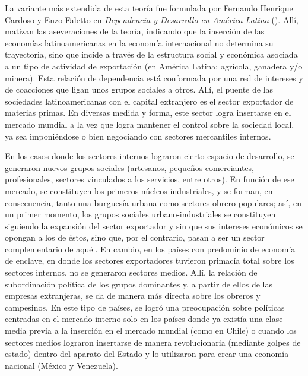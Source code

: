 \documentclass{article}
\begin{document}
La variante más extendida de esta teoría fue formulada por Fernando Henrique Cardoso
y Enzo Faletto en \textit{Dependencia y Desarrollo en América Latina} 
(\citeyear{cardoso1979dependencia}). Allí, matizan las aseveraciones de la teoría, 
indicando que la inserción de las economías latinoamericanas en la economía internacional
no determina su trayectoria, sino que incide a través de la estructura social y económica
asociada a un tipo de actividad de exportación (en América Latina: agrícola, ganadera y/o
minera). Esta relación de dependencia está conformada por una red de intereses y de 
coacciones que ligan unos grupos sociales a otros. Allí, el puente de las sociedades 
latinoamericanas con el capital extranjero es el sector exportador de materias primas. 
En diversas medida y forma, este sector logra insertarse en el mercado mundial a la vez 
que logra mantener el control sobre la sociedad local, ya sea imponiéndose o bien 
negociando con sectores mercantiles internos.

En los casos donde los sectores internos lograron cierto espacio de desarrollo, se generaron
nuevos grupos sociales (artesanos, pequeños comerciantes, profesionales, sectores vinculados
a los servicios, entre otros). En función de ese mercado, se constituyen los primeros 
núcleos industriales, y se forman, en consecuencia, tanto una burguesía urbana como sectores 
obrero-populares; así, en un primer momento, los grupos sociales urbano-industriales se 
constituyen siguiendo la expansión del sector exportador y sin que sus intereses económicos 
se opongan a los de éstos, sino que, por el contrario, pasan a ser un sector complementario 
de aquél. En cambio, en los países con predominio de economía de enclave, en donde los 
sectores exportadores tuvieron primacía total sobre los sectores internos, no se generaron 
sectores medios. Allí, la relación de subordinación política de los grupos dominantes y, a 
partir de ellos de las empresas extranjeras, se da de manera más directa sobre los obreros y 
campesinos. En este tipo de países, se logró una preocupación sobre políticas centradas en 
el mercado interno solo en los países donde ya existía una clase media previa a la inserción 
en el mercado mundial (como en Chile) o cuando los sectores medios lograron insertarse de manera 
revolucionaria (mediante golpes de estado) dentro del aparato del Estado y lo utilizaron 
para crear una economía nacional (México y Venezuela).
\end{document}

